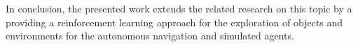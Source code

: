     In conclusion, the presented work extends the related research on this topic by a providing a reinforcement learning approach for the exploration of objects and environments for the autonomous navigation and simulated agents.
    
    
    
    


    
